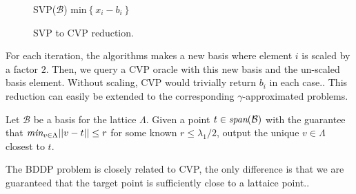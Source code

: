     \begin{figure}
    \label{Fig: SVP to CVP Reduction}
    \begin{algorithm}[H]
    \DontPrintSemicolon
     SVP($\mathcal{B}$)\;
      \Return min\(\left\{x_i - b_i\right\}\)
     
     \caption{SVP to CVP reduction.}
    \end{algorithm}
    \end{figure}
    For each iteration, the algorithms makes a new basis where element \(i\) is scaled by a factor \(2\). Then, we query a CVP oracle with this new basis and the un-scaled basis element. Without scaling, CVP would trivially return \(b_i\) in each case.. This reduction can easily be extended to the corresponding \(\gamma\)-approximated problems.\par
    \begin{definition}
    Let \(\mathcal{B}\) be a basis for the lattice \(\Lambda\). Given a point \(t\in\emph{span}(\mathcal{B})\) with the guarantee that \(\emph{min}_{v\in\Lambda}||v-t||\leq r\) for some known \(r\leq\lambda_1/2\), output the unique \(v\in\Lambda\) closest to \(t\).
    \end{definition}
    The BDDP problem is closely related to CVP, the only difference is that we are guaranteed that the target point is sufficiently close to a lattaice point..
    
